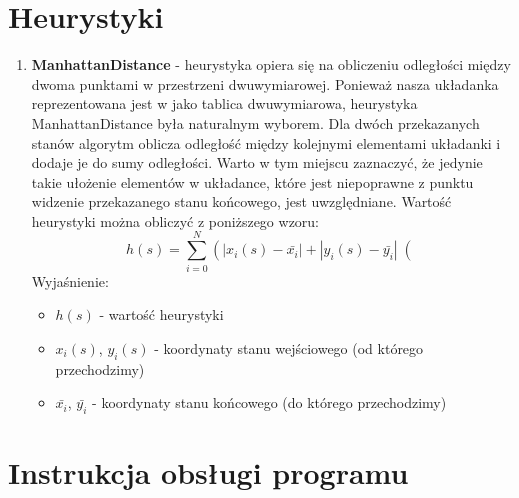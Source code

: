 \documentclass{classrep}
\begin{document}
	\section{Heurystyki}
		\begin{enumerate}
			\item \textbf{ManhattanDistance} - heurystyka opiera się na obliczeniu odległości między dwoma punktami
			w przestrzeni dwuwymiarowej. Ponieważ nasza układanka reprezentowana jest w jako tablica dwuwymiarowa,
			heurystyka ManhattanDistance była naturalnym wyborem. Dla dwóch przekazanych stanów algorytm
			oblicza odległość między kolejnymi elementami układanki i dodaje je do sumy odległości. Warto w tym
			miejscu zaznaczyć, że jedynie takie ułożenie elementów w układance, które jest niepoprawne z punktu
			widzenie przekazanego stanu końcowego, jest uwzględniane. 
			Wartość heurystyki można obliczyć z poniższego wzoru:
			\begin{equation}
				h(s) = \sum_{i=0}^{N} \left(  | x_i(s) - \bar{x_i} | + | y_i(s) - \bar{y_i} | \right( 
			\end{equation}
			Wyjaśnienie:
			\begin{itemize}
				\item $h(s)$ - wartość heurystyki
				\item $x_i(s)$, $y_i(s)$ - koordynaty stanu wejściowego (od którego przechodzimy)
				\item $\bar{x_i}$, $\bar{y_i}$ - koordynaty stanu końcowego (do którego przechodzimy)
			\end{itemize}
		\end{enumerate}
		
	\section{Instrukcja obsługi programu}
\end{document}
